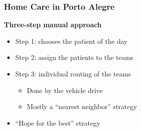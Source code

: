 \begin{frame}
   \frametitle{Home Care in Porto Alegre}


   \textbf{Three-step manual approach}
   \begin{itemize}
      \item Step 1: chooses the patient of the day
      \item Step 2: assign the patients to the teams
      \item Step 3: individual routing of the teams
      \begin{itemize}
         \item Done by the vehicle drive
         \item Mostly a ``nearest neighbor'' strategy
      \end{itemize}
      \item ``Hope for the best'' strategy
   \end{itemize}

\end{frame}

%

